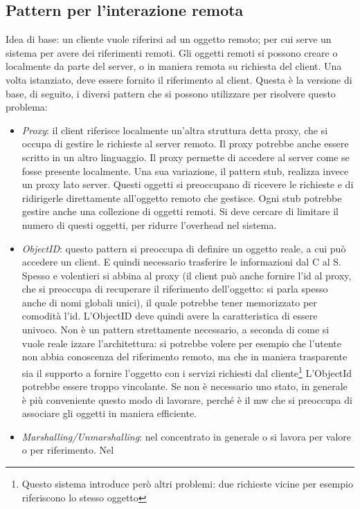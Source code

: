 \subsection{Pattern per l'interazione remota}
Idea di base: un cliente vuole riferirsi ad un oggetto remoto; per cui serve un sistema per avere dei riferimenti
remoti. Gli oggetti remoti si possono creare o localmente da parte del server, o in maniera remota su richiesta del
client. Una volta istanziato, deve essere fornito il riferimento al client. Questa è la versione di base, di seguito,
i diversi pattern che si possono utilizzare per risolvere questo problema:
\begin{itemize}
 \item \textit{Proxy}: il client riferisce localmente un'altra struttura detta proxy, che si occupa di gestire le
 richieste al server remoto. Il proxy potrebbe anche essere scritto in un altro linguaggio. Il proxy permette di
 accedere al server come se fosse presente localmente.
 Una sua variazione, il pattern stub, realizza invece un proxy lato server. 
 Questi oggetti si preoccupano di ricevere le richieste e di ridirigerle direttamente all'oggetto remoto che gestisce.
 Ogni stub potrebbe gestire anche una collezione di oggetti remoti. 
 Si deve cercare di limitare il numero di questi oggetti, per ridurre l'overhead nel sistema.
 \item \textit{ObjectID}: questo pattern si preoccupa di definire un oggetto reale, a cui può accedere un client. E
 quindi necessario trasferire le informazioni dal C al S. Spesso e volentieri si abbina al proxy (il client può anche
 fornire l'id al proxy, che si preoccupa di recuperare il riferimento dell'oggetto: si parla spesso anche di nomi
 globali unici), il quale potrebbe tener memorizzato per comodità l'id. L'ObjectID deve quindi avere la caratteristica
 di essere univoco.
 Non è un pattern strettamente necessario, a seconda di come si vuole reale izzare l'architettura: si potrebbe volere
 per esempio che l'utente non abbia conoscenza del riferimento remoto, ma che in maniera trasparente sia il
 supporto a fornire l'oggetto con i servizi richiesti dal cliente\footnote{Questo sistema introduce però altri
 problemi: due richieste vicine per esempio riferiscono lo stesso oggetto} L'ObjectId potrebbe essere troppo
 vincolante. Se non è necessario uno stato, in generale è più conveniente questo modo di lavorare, perché è il mw 
 che si preoccupa di associare gli oggetti in maniera efficiente.
 \item \textit{Marshalling/Unmarshalling}: nel concentrato in generale o si lavora per valore o per riferimento. Nel

\end{itemize}
